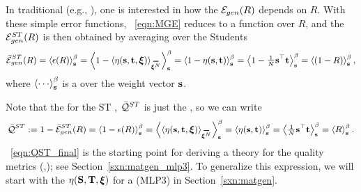 

In traditional \STATMECH (e.g., \cite{SST92}), one is interested in how the \emph{\TotalModelGeneralizationError} ${\mathcal{E}}_{gen}(R)$ depends on $R$.
With these simple error functions, \EQN~\ref{eqn:MGE} reduces to a function over $R$,
and the \AverageSTGeneralizationError ${\mathcal{E}}^{ST}_{gen}(R)$ is then obtained by averaging over the Students 
\begin{align}
\label{eqn:AVGSTGE_R}
\AVGSTGE(R)=\THRMAVG{\EPSL(R)}=
\THRMAVG{1-\langle\ETA(\SVEC,\TVEC,\XI)\rangle_{\AVGNDXI}}=
\THRMAVG{1-\ETA(\SVEC,\TVEC)}=
\THRMAVG{1-\tfrac{1}{N}\SVEC^{\top}\TVEC}=
\THRMAVG{(1-R)}  ,
\end{align}
where $\THRMAVG{\cdots}$ is a \ThermalAverage over the \Student weight vector ${\mathbf{s}}$.

Note that the \ModelQuality for the ST \Perceptron, $\bar{\mathcal{Q}}^{ST}$
is just the \AverageGeneralizationAccuracy, so we can write
\begin{align}
\label{eqn:QST_final}
\Q^{ST} := 1 - \AVGSTGE(R) 
       = \THRMAVG{1 - \EPSL(R)} 
       = \THRMAVG{\langle\ETA(\SVEC, \TVEC, \XI)\rangle_{\AVGNDXI}} 
       = \THRMAVG{\ETA(\SVEC, \TVEC)} 
       = \THRMAVG{\tfrac{1}{N}\SVEC^{\top}\TVEC} 
       = \THRMAVG{R}.
\end{align}
\EQN~\ref{eqn:QST_final} is the starting point for deriving a \SEMIEMP theory for the \WW quality metrics (\ALPHA,\ALPHAHAT);
see Section~\ref{sxn:matgen_mlp3}.
To generalize this expression, we will start with the \SelfOverlap $\eta({\mathbf{S}},{\mathbf{T}},\boldsymbol{\xi})$ for a
\MultiLayerPerceptron (MLP3) in Section~\ref{sxn:matgen}.

